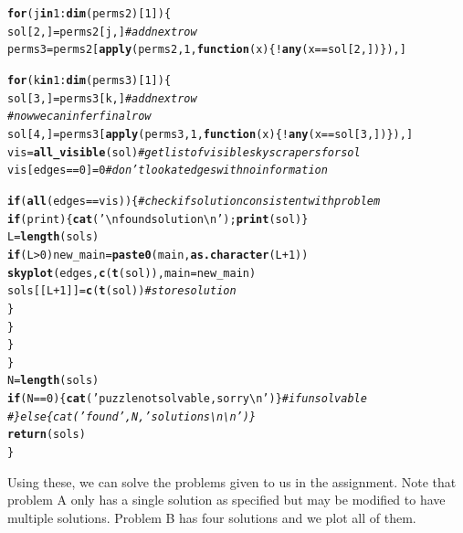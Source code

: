 \documentclass[12pt]{article}\usepackage[]{graphicx}\usepackage[]{color}
\makeatletter
\newcommand{\hlnum}[1]{\textcolor[rgb]{0.686,0.059,0.569}{#1}}%
\newcommand{\hlstr}[1]{\textcolor[rgb]{0.192,0.494,0.8}{#1}}%
\newcommand{\hlcom}[1]{\textcolor[rgb]{0.678,0.584,0.686}{\textit{#1}}}%
\newcommand{\hlopt}[1]{\textcolor[rgb]{0,0,0}{#1}}%
\newcommand{\hlstd}[1]{\textcolor[rgb]{0.345,0.345,0.345}{#1}}%
\newcommand{\hlkwa}[1]{\textcolor[rgb]{0.161,0.373,0.58}{\textbf{#1}}}%
\newcommand{\hlkwb}[1]{\textcolor[rgb]{0.69,0.353,0.396}{#1}}%
\newcommand{\hlkwc}[1]{\textcolor[rgb]{0.333,0.667,0.333}{#1}}%
\newcommand{\hlkwd}[1]{\textcolor[rgb]{0.737,0.353,0.396}{\textbf{#1}}}%
\newenvironment{kframe}{%
 \def\at@end@of@kframe{}%
 \ifinner\ifhmode%
  \def\at@end@of@kframe{\end{minipage}}%
  \begin{minipage}{\columnwidth}%
 \fi\fi%
 \def\FrameCommand##1{\hskip\@totalleftmargin \hskip-\fboxsep
 \colorbox{shadecolor}{##1}\hskip-\fboxsep
     \hskip-\linewidth \hskip-\@totalleftmargin \hskip\columnwidth}%
 \MakeFramed {\advance\hsize-\width
   \@totalleftmargin\z@ \linewidth\hsize
   \@setminipage}}%
 {\par\unskip\endMakeFramed%
 \at@end@of@kframe}
\newenvironment{knitrout}{}{} %
\makeatother
\begin{document}
\begin{knitrout}
\begin{kframe}
\begin{alltt}
    \hlkwa{for} \hlstd{(j} \hlkwa{in} \hlnum{1}\hlopt{:}\hlkwd{dim}\hlstd{(perms2)[}\hlnum{1}\hlstd{])\{}
      \hlstd{sol[}\hlnum{2}\hlstd{,]} \hlkwb{=} \hlstd{perms2[j,]} \hlcom{#add next row}
      \hlstd{perms3} \hlkwb{=} \hlstd{perms2[}\hlkwd{apply}\hlstd{(perms2,} \hlnum{1}\hlstd{,} \hlkwa{function}\hlstd{(}\hlkwc{x}\hlstd{)\{} \hlopt{!}\hlkwd{any}\hlstd{(x} \hlopt{==} \hlstd{sol[}\hlnum{2}\hlstd{,]) \}), ]}

      \hlkwa{for} \hlstd{(k} \hlkwa{in} \hlnum{1}\hlopt{:}\hlkwd{dim}\hlstd{(perms3)[}\hlnum{1}\hlstd{])\{}
        \hlstd{sol[}\hlnum{3}\hlstd{,]} \hlkwb{=} \hlstd{perms3[k,]} \hlcom{#add next row}
        \hlcom{#now we can infer final row}
        \hlstd{sol[}\hlnum{4}\hlstd{,]} \hlkwb{=} \hlstd{perms3[}\hlkwd{apply}\hlstd{(perms3,} \hlnum{1}\hlstd{,} \hlkwa{function}\hlstd{(}\hlkwc{x}\hlstd{)\{} \hlopt{!}\hlkwd{any}\hlstd{(x} \hlopt{==} \hlstd{sol[}\hlnum{3}\hlstd{,]) \}), ]}
        \hlstd{vis} \hlkwb{=} \hlkwd{all_visible}\hlstd{(sol)} \hlcom{#get list of visible skyscrapers for sol}
        \hlstd{vis[ edges} \hlopt{==} \hlnum{0} \hlstd{]}\hlkwb{=}\hlnum{0} \hlcom{#don't look at edges with no information}

        \hlkwa{if} \hlstd{(} \hlkwd{all}\hlstd{(edges} \hlopt{==} \hlstd{vis) )\{} \hlcom{#check if solution consistent with problem}
          \hlkwa{if}\hlstd{(print)\{}\hlkwd{cat}\hlstd{(}\hlstr{'\textbackslash{}nfound solution\textbackslash{}n'}\hlstd{);} \hlkwd{print}\hlstd{(sol)\}}
          \hlstd{L} \hlkwb{=} \hlkwd{length}\hlstd{(sols)}
          \hlkwa{if} \hlstd{(L}\hlopt{>}\hlnum{0}\hlstd{) new_main} \hlkwb{=} \hlkwd{paste0}\hlstd{(main,}\hlkwd{as.character}\hlstd{(L}\hlopt{+}\hlnum{1}\hlstd{))}
          \hlkwd{skyplot}\hlstd{(edges,}\hlkwd{c}\hlstd{(}\hlkwd{t}\hlstd{(sol)),}\hlkwc{main}\hlstd{=new_main)}
          \hlstd{sols[[L}\hlopt{+}\hlnum{1}\hlstd{]]} \hlkwb{=} \hlkwd{c}\hlstd{(}\hlkwd{t}\hlstd{(sol))} \hlcom{#store solution}
        \hlstd{\}}
      \hlstd{\}}
    \hlstd{\}}
  \hlstd{\}}
  \hlstd{N} \hlkwb{=} \hlkwd{length}\hlstd{(sols)}
  \hlkwa{if} \hlstd{(N} \hlopt{==} \hlnum{0}\hlstd{)\{}\hlkwd{cat}\hlstd{(}\hlstr{'puzzle not solvable, sorry\textbackslash{}n'}\hlstd{)\}} \hlcom{#if unsolvable}
  \hlcom{#\}else\{cat('found', N, 'solutions\textbackslash{}n\textbackslash{}n')\} }
  \hlkwd{return}\hlstd{(sols)}
\hlstd{\}}
\end{alltt}
\end{kframe}
\end{knitrout}

Using these, we can solve the problems given to us in the assignment. Note that problem A only has a single solution as specified but may be modified to have multiple solutions. Problem B has four solutions and we plot all of them.
\end{document}
